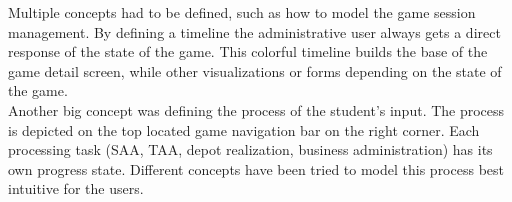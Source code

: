 Multiple concepts had to be defined, such as how to model the game session management. By defining a timeline the administrative user always gets a direct response of the state of the game. This colorful timeline builds the base of the game detail screen, while other visualizations or forms depending on the state of the game.\\

Another big concept was defining the process of the student's input. The process is depicted on the top located game navigation bar on the right corner. Each processing task (SAA, TAA, depot realization, business administration) has its own progress state. Different concepts have been tried to model this process best intuitive for the users.
